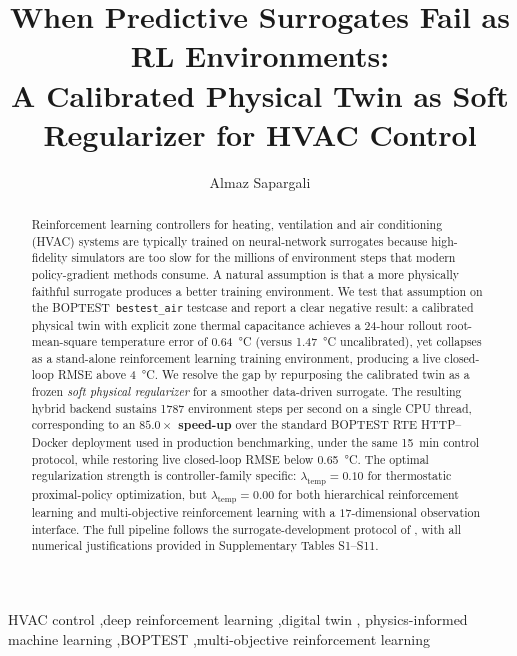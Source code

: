 \documentclass[3p,review,authoryear,12pt]{elsarticle}
\newcommand{\boptest}{BOPTEST}
\begin{document}
\begin{frontmatter}

\title{When Predictive Surrogates Fail as RL Environments:\\
       A Calibrated Physical Twin as Soft Regularizer for HVAC Control%
       }


\author[a]{Almaz Sapargali}

\begin{abstract}
Reinforcement learning controllers for heating, ventilation and air conditioning
(HVAC) systems are typically trained on neural-network surrogates because
high-fidelity simulators are too slow for the millions of environment steps that
modern policy-gradient methods consume. A natural assumption is that a more
physically faithful surrogate produces a better training environment. We
test that assumption on the \boptest\ \texttt{bestest\_air} testcase and report
a clear negative result: a calibrated physical twin with explicit zone thermal
capacitance achieves a 24-hour rollout root-mean-square temperature error of
\SI{0.64}{\celsius} (versus \SI{1.47}{\celsius} uncalibrated), yet collapses as
a stand-alone reinforcement learning training environment, producing a live
closed-loop RMSE above \SI{4}{\celsius}. We resolve the gap by repurposing the
calibrated twin as a frozen \emph{soft physical regularizer} for a smoother
data-driven surrogate. The resulting hybrid backend sustains \num{1787}
environment steps per second on a single CPU thread, corresponding to an
\textbf{$85.0\times$ speed-up} over the standard \boptest{} RTE
HTTP--Docker deployment used in production benchmarking, under the same
\SI{15}{\minute} control protocol, while restoring live closed-loop RMSE
below \SI{0.65}{\celsius}. The optimal regularization strength is
controller-family specific: $\lambda_{\mathrm{temp}}=0.10$ for thermostatic
proximal-policy optimization, but $\lambda_{\mathrm{temp}}=0.00$ for both
hierarchical reinforcement learning and multi-objective reinforcement learning
with a $17$-dimensional observation interface. The full pipeline follows the
surrogate-development protocol of \cite{HouEvins2024}, with all numerical
justifications provided in Supplementary Tables S1--S11.
\end{abstract}

\begin{keyword}
HVAC control \sep deep reinforcement learning \sep digital twin \sep
physics-informed machine learning \sep \boptest{} \sep multi-objective
reinforcement learning
\end{keyword}

\end{frontmatter}
\end{document}
